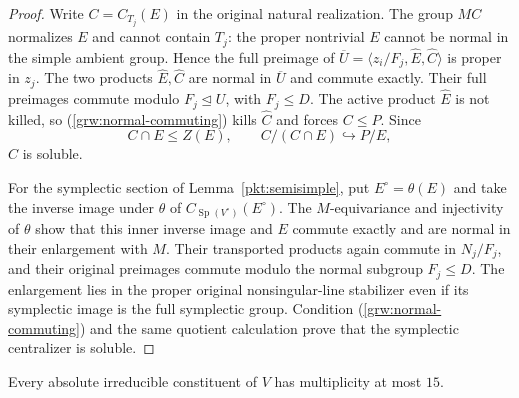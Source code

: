 \begin{proof}
Write $C=C_{T_j}(E)$ in the original natural realization.
The group $MC$ normalizes $E$ and cannot contain $T_j$: the
proper nontrivial $E$ cannot be normal in the simple ambient
group.  Hence the full preimage of
$\overline U=\langle z_i/F_j,\widehat E,\widehat C\rangle$
is proper in $z_j$.  The two products $\widehat E,\widehat C$
are normal in $\overline U$ and commute exactly.  Their full
preimages commute modulo $F_j\trianglelefteq U$, with
$F_j\le D$.  The active product $\widehat E$ is not killed,
so \textup{(\ref{grw:normal-commuting})} kills $\widehat C$ and forces $C\le P$.
Since
\[
 C\cap E\le Z(E),\qquad C/(C\cap E)\hookrightarrow P/E,
\]
$C$ is soluble.

For the symplectic section of Lemma~\ref{pkt:semisimple}, put
$E^\circ=\theta(E)$ and take the inverse image under $\theta$
of $C_{\operatorname{Sp}(V^\circ)}(E^\circ)$.
The $M$-equivariance and injectivity of $\theta$ show that this
inner inverse image and $E$ commute exactly and are normal in
their enlargement with $M$.  Their transported products again
commute in $N_j/F_j$, and their original preimages commute
modulo the normal subgroup $F_j\le D$.  The enlargement lies
in the proper original nonsingular-line stabilizer even if
its symplectic image is the full symplectic group.
Condition \textup{(\ref{grw:normal-commuting})} and the same quotient calculation prove
that the symplectic centralizer is soluble.
\end{proof}

\begin{lemma}
\label{pkt:multiplicity}
Every absolute irreducible constituent of $V$ has multiplicity at
most $15$.
\end{lemma}

